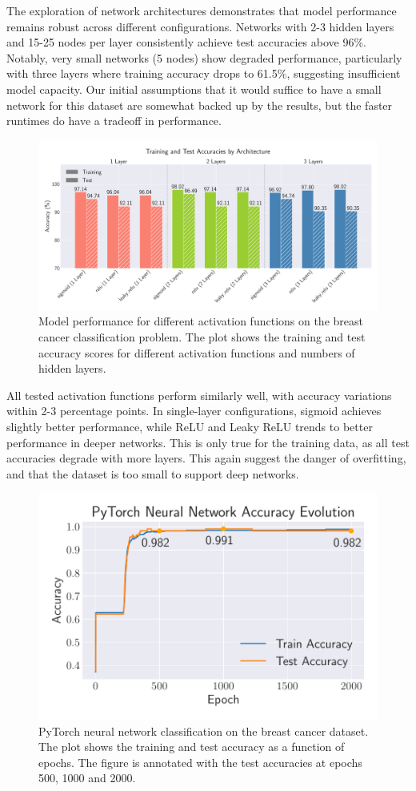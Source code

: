 The exploration of network architectures demonstrates that model performance remains robust across different configurations. Networks with 2-3 hidden layers and 15-25 nodes per layer consistently achieve test accuracies above 96\%. Notably, very small networks (5 nodes) show degraded performance, particularly with three layers where training accuracy drops to 61.5\%, suggesting insufficient model capacity. Our initial assumptions that it would suffice to have a small network for this dataset are somewhat backed up by the results, but the faster runtimes do have a tradeoff in performance.

\onecolumngrid
\begin{figure}[ht!]
    \centering
    \includegraphics[width = .9\textwidth]{../figs/classification_activations_layers.pdf}
    \caption{Model performance for different activation functions on the breast cancer classification problem. The plot shows the training and test accuracy scores for different activation functions and numbers of hidden layers.}
    \label{fig:NN_Classification_activations_layers}
\end{figure}
\twocolumngrid

All tested activation functions perform similarly well, with accuracy variations within 2-3 percentage points. In single-layer configurations, sigmoid achieves slightly better performance, while ReLU and Leaky ReLU trends to better performance in deeper networks. This is only true for the training data, as all test accuracies degrade with more layers. This again suggest the danger of overfitting, and that the dataset is too small to support deep networks.

\begin{figure}[ht!]
    \centering
    \includegraphics[width =.45\textwidth]{../figs/nn_torch_breast_cancer.pdf}
    \caption{PyTorch neural network classification on the breast cancer dataset. The plot shows the training and test accuracy as a function of epochs. The figure is annotated with the test accuracies at epochs 500, 1000 and 2000.}
    \label{fig:NN_Torch_breast_cancer}
\end{figure}

